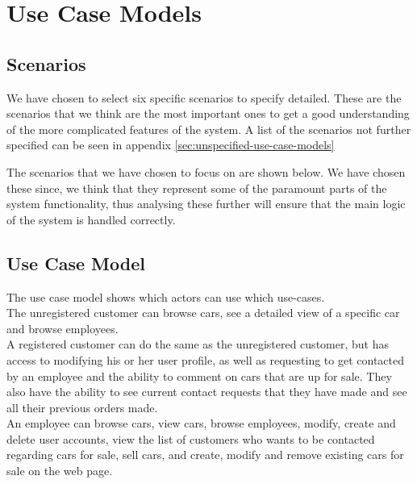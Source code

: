 \section{Use Case Models}

\subsection{Scenarios}
We have chosen to select six specific scenarios to specify detailed. These are the scenarios that we think are the most important ones to get a good understanding of the more complicated features of the system. A list of the scenarios not further specified can be seen in appendix \ref{sec:unspecified-use-case-models}

The scenarios that we have chosen to focus on are shown below. We have chosen these since, we think that they represent some of the paramount parts of the system functionality, thus analysing these further will ensure that the main logic of the system is handled correctly.













\subsection{Use Case Model}
The use case model shows which actors can use which use-cases.\\

The unregistered customer can browse cars, see a detailed view of a specific car and browse employees.\\
A registered customer can do the same as the unregistered customer, but has access to modifying his or her user profile, as well as requesting to get contacted by an employee and the ability to comment on cars that are up for sale.
They also have the ability to see current contact requests that they have made and see all their previous orders made.\\

An employee can browse cars, view cars, browse employees, modify, create and delete user accounts, view the list of customers who wants to be contacted regarding cars for sale, sell cars, and create, modify and remove existing cars for sale on the web page.\\

